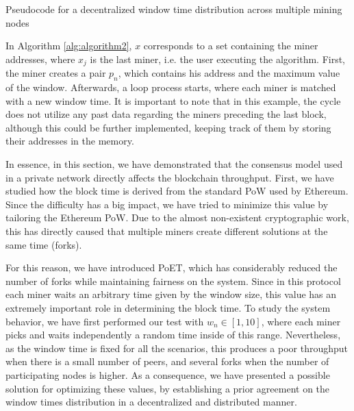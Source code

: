  \begin{algorithm}
  \caption{Pseudocode for a decentralized window time distribution across multiple mining nodes}
 \label{alg:algorithm2}
  \begin{algorithmic}[1]
  \ENDFOR
 \end{algorithmic}
\end{algorithm}

In Algorithm \ref{alg:algorithm2}, $x$ corresponds to a set containing the miner addresses, where $x_j$ is the last miner, i.e. the user executing the algorithm. First, the miner creates a pair $p_n$, which contains his address and the maximum value of the window. Afterwards, a loop process starts, where each miner is matched with a new window time. It is important to note that in this example, the cycle does not utilize any past data regarding the miners preceding the last block, although this could be further implemented, keeping track of them by storing their addresses in the memory.

In essence, in this section, we have demonstrated that the consensus model used in a private network directly affects the blockchain throughput. First, we have studied how the block time is derived from the standard PoW used by Ethereum. Since the difficulty has a big impact, we have tried to minimize this value by tailoring the Ethereum PoW. Due to the almost non-existent cryptographic work, this has directly caused that multiple miners create different solutions at the same time (forks). 

For this reason, we have introduced PoET, which has considerably reduced the number of forks while maintaining fairness on the system. Since in this protocol each miner waits an arbitrary time given by the window size, this value has an extremely important role in determining the block time. To study the system behavior, we have first performed our test with $w_n \in [1,10]$, where each miner picks and waits independently a random time inside of this range. Nevertheless, as the window time is fixed for all the scenarios, this produces a poor throughput when there is a small number of peers, and several forks when the number of participating nodes is higher. As a consequence, we have presented a possible solution for optimizing these values, by establishing a prior agreement on the window times distribution in a decentralized and distributed manner.

